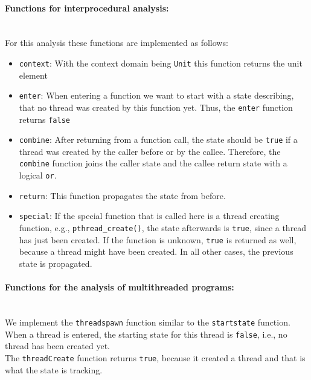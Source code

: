     \paragraph{Functions for interprocedural analysis:}\mbox{}\\
    For this analysis these functions are implemented as follows:
    \begin{itemize}
      \item \texttt{context}: With the context domain being \texttt{Unit} this function returns the unit element
      \item \texttt{enter}: When entering a function we want to start with a state describing, that no thread was created by this function yet. Thus, the \texttt{enter} function returns \texttt{false}
      \item \texttt{combine}: After returning from a function call, the state should be \texttt{true} if a thread was created by the caller before or by the callee. Therefore, the \texttt{combine} function joins the caller state and the callee return state with a logical \texttt{or}. 
      \item \texttt{return}: This function propagates the state from before.
      \item \texttt{special}: If the special function that is called here is a thread creating function, e.g., \texttt{pthread\_create()}, the state afterwards is \texttt{true}, since a thread has just been created. If the function is unknown, \texttt{true} is returned as well, because a thread might have been created. In all other cases, the previous state is propagated. 
    \end{itemize}

    \paragraph{Functions for the analysis of multithreaded programs:}\mbox{}\\
    We implement the \texttt{threadspawn} function similar to the \texttt{startstate} function. When a thread is entered, the starting state for this thread is \texttt{false}, i.e., no thread has been created yet.\\
    The \texttt{threadCreate} function returns \texttt{true}, because it created a thread and that is what the state is tracking.

